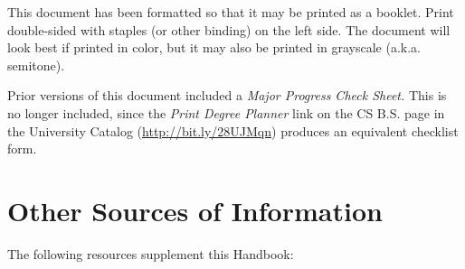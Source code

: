 \documentclass{book}
\begin{document}
This document has been formatted so that it may be printed as a booklet. Print double-sided with staples (or other binding) on the left side. The document will look best if printed in color, but it may also be printed in grayscale (a.k.a. semitone).

Prior versions of this document included a \emph{Major Progress Check Sheet.} This is no longer included, since the \emph{Print Degree Planner} link on the CS B.S. page in the University Catalog (\url{http://bit.ly/28UJMqn}) produces an equivalent checklist form.

\chapter{Other Sources of Information}

The following resources supplement this Handbook:
\end{document}
